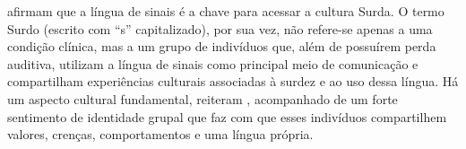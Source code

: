 

 afirmam que a língua de sinais é a chave para acessar a cultura Surda.
O termo Surdo (escrito com ``s'' capitalizado), por sua vez, não refere-se apenas a uma condição clínica, mas a um grupo de indivíduos que, além de possuírem perda auditiva, utilizam a língua de sinais como principal meio de comunicação e compartilham experiências culturais associadas à surdez e ao uso dessa língua.
Há um aspecto cultural fundamental, reiteram , acompanhado de um forte sentimento de identidade grupal que faz com que esses indivíduos compartilhem valores, crenças, comportamentos e uma língua própria.







